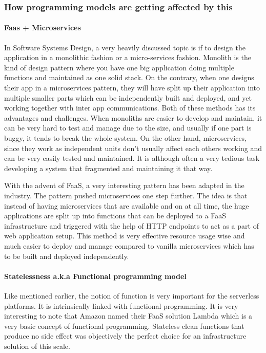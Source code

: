 \documentclass[12pt,titlepage]{article}
\begin{document}
\subsubsection{How programming models are getting affected by this}
\label{sec:orgd141df4}
\paragraph{Faas + Microservices}
\label{sec:org63c97d7}
In Software Systems Design, a very heavily discussed topic is if to design the
application in a monolithic fashion or a micro-services fashion. Monolith is the
kind of design pattern where you have one big application doing multiple
functions and maintained as one solid stack. On the contrary, when one designs
their app in a microservices pattern, they will have split up their application
into multiple smaller parts which can be independently built and deployed, and
yet working together with inter app communications. Both of these methods has
its advantages and challenges. When monoliths are easier to develop and
maintain, it can be very hard to test and manage due to the size, and usually if
one part is buggy, it tends to break the whole system. On the other hand,
microservices, since they work as independent units don't usually affect each
others working and can be very easily tested and maintained. It is although
often a very tedious task developing a system that fragmented and maintaining it
that way. 

With the advent of FaaS, a very interesting pattern has been adapted in the
industry. The pattern pushed microservices one step further. The idea is that
instead of having microservices that are available and on at all time, the huge
applications are split up into functions that can be deployed to a FaaS
infrastructure and triggered with the help of HTTP endpoints to act as a part of
web application setup. This method is very effective resource usage wise and
much easier to deploy and manage compared to vanilla microservices which has to
be built and deployed independently.
\paragraph{Statelessness a.k.a Functional programming model}
\label{sec:org86d0fd7}
Like mentioned earlier, the notion of function is very important for the
serverless platforms. It is intrinsically linked with functional programming. It
is very interesting to note that Amazon named their FaaS solution Lambda which
is a very basic concept of functional programming. Stateless clean functions
that produce no side effect was objectively the perfect choice for an
infrastructure solution of this scale.
\end{document}
